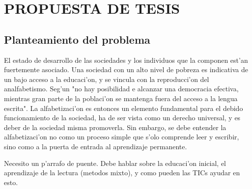 
\chapter{PROPUESTA DE TESIS}



\section{Planteamiento del problema}



El estado de desarrollo de las sociedades y los individuos que la componen est'an fuertemente
asociado. Una sociedad con un alto nivel de pobreza es indicativa de un bajo acceso a la educaci'on, 
y se vincula con la reproducci'on del analfabetismo. Seg'un \citet{infante13} "no hay posibilidad
e alcanzar una democracia efectiva, mientras gran parte de la poblaci'on se mantenga fuera del
acceso a la lengua escrita". La alfabetizaci'on es entonces un elemento fundamental para el debido funcionamiento de la sociedad, ha de ser vista como un derecho universal, y es deber de la sociedad misma promoverla. Sin embargo, se debe entender la alfabetizaci'on no como un proceso
simple que s'olo comprende leer y escribir, sino como a la puerta de entrada al aprendizaje
permanente. 

{\color{red} Necesito un p'arrafo de puente. Debe hablar sobre la educaci'on inicial,
el aprendizaje de la lectura (metodos mixto), y como pueden las TICs ayudar en esto.}

